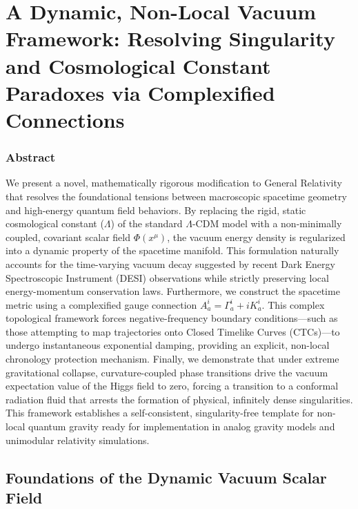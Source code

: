 \section{A Dynamic, Non-Local Vacuum Framework: Resolving Singularity
and Cosmological Constant Paradoxes via Complexified
Connections}\label{a-dynamic-non-local-vacuum-framework-resolving-singularity-and-cosmological-constant-paradoxes-via-complexified-connections}

\subsubsection{Abstract}\label{abstract}

We present a novel, mathematically rigorous modification to General
Relativity that resolves the foundational tensions between macroscopic
spacetime geometry and high-energy quantum field behaviors. By replacing
the rigid, static cosmological constant (\(\Lambda\)) of the standard
\(\Lambda\)-CDM model with a non-minimally coupled, covariant scalar
field \(\Phi(x^\mu)\), the vacuum energy density is regularized into a
dynamic property of the spacetime manifold. This formulation naturally
accounts for the time-varying vacuum decay suggested by recent Dark
Energy Spectroscopic Instrument (DESI) observations while strictly
preserving local energy-momentum conservation laws. Furthermore, we
construct the spacetime metric using a complexified gauge connection
\(A_a^i = \Gamma_a^i + i K_a^i\). This complex topological framework
forces negative-frequency boundary conditions---such as those attempting
to map trajectories onto Closed Timelike Curves (CTCs)---to undergo
instantaneous exponential damping, providing an explicit, non-local
chronology protection mechanism. Finally, we demonstrate that under
extreme gravitational collapse, curvature-coupled phase transitions
drive the vacuum expectation value of the Higgs field to zero, forcing a
transition to a conformal radiation fluid that arrests the formation of
physical, infinitely dense singularities. This framework establishes a
self-consistent, singularity-free template for non-local quantum gravity
ready for implementation in analog gravity models and unimodular
relativity simulations.

\subsection{Foundations of the Dynamic Vacuum Scalar
Field}\label{foundations-of-the-dynamic-vacuum-scalar-field}

